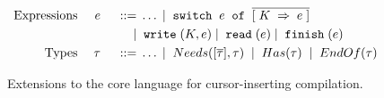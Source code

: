 \begin{figure*}
  \begin{displaymath}
    \begin{aligned}
      \textup{Expressions} && \; {e} \; && \; ::= \; & \ldots \; | \; \; \texttt{switch} \;\; e\; \; \texttt{of} \;\; \overline{[{\; {K} \;} \Rightarrow {\; {e} \;}]} \; \\
      && && \; | \; & \; \texttt{write} \;(K,e) \; | \; \; \texttt{read} \;(e) \; | \;
      \; \texttt{finish} \;(e) \\      
      \textup{Types} && \; {\tau} \; && \; ::= \; & \ldots \; | \; \; Needs([\overline{\tau}],\tau) \; \; | \; \; Has(\tau) \; 
\; | \; \; EndOf(\tau) \; \\
    \end{aligned}
  \end{displaymath}
  \caption{Extensions to the core language for cursor-inserting compilation.}
  \label{fig:target}
\end{figure*}
